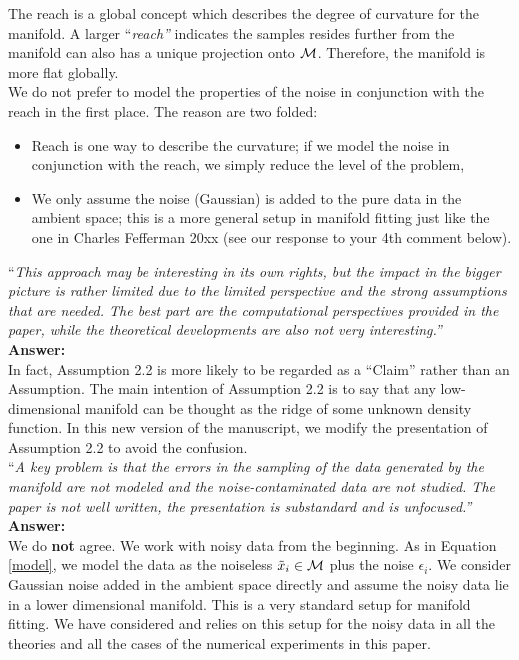 \documentclass[12pt]{article}
\begin{document}
The reach is a global concept which describes the degree of curvature for the manifold. A larger {``\it reach''} indicates the samples resides further from the manifold can also has a unique projection onto $\cal M$. Therefore, the manifold is more flat globally.\\

We do not prefer to model the properties of the noise in conjunction with the reach in the first place. The reason are two folded:
\begin{itemize}
\item Reach is one way to describe the curvature; if we model the noise in conjunction with the reach, we simply reduce the level of the problem,
\item We only assume the noise (Gaussian) is added to the pure data in the ambient space; this is a more general setup in manifold fitting just like the one in Charles Fefferman 20xx (see our response to your 4th comment below). 
\end{itemize}


\noindent ``\textit{This approach may be interesting in its own rights, but the impact in the bigger picture is rather limited due to the limited perspective and the strong assumptions that are needed. The best part are the computational perspectives provided in the paper, while the theoretical developments are also not very interesting.'' }\\

{\bf Answer:}\\
In fact, Assumption 2.2 is more likely to be regarded as a ``Claim'' rather than an Assumption. The main intention of Assumption 2.2 is to say that any low-dimensional manifold can be thought as the ridge of some unknown density function. In this new version of the manuscript, we modify the presentation of Assumption 2.2 to avoid the confusion.\\


\noindent ``\textit {A key problem is that the errors in the sampling of the data generated by the manifold are not modeled and the noise-contaminated data are not studied. The paper is not well written, the presentation is substandard  and is unfocused.''}\\

{\bf Answer:}\\
We do {\bf not} agree. We work with noisy data from the beginning. As in Equation \eqref{model}, we model the data as the noiseless $\tilde{x}_i\in \cal M$ plus the noise $\epsilon_i$. We consider Gaussian noise added  in the ambient space directly and assume the noisy data lie in a lower dimensional manifold.  This is a very standard setup for manifold fitting. We have considered and relies on this setup for the noisy data in all the theories and all the cases of the numerical experiments in this paper.\\
\end{document}
